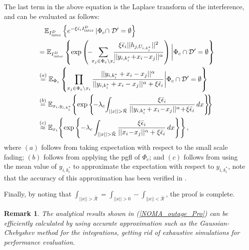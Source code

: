 \documentclass[10pt, doublecolumn]{IEEEtran}
\newtheorem{Remark}{Remark}
\begin{document}
\begin{IEEEproof}
The last term in the above equation is the Laplace transform of the interference, and can be evaluated as follows:
\begin{align}
&\quad{\mathbb{E}}_{I_{\text{inter}}^D } \left\{e^{-\xi\bar{\epsilon}_i  I_{\text{inter}}^D}\left| \Phi_c\cap\right.\mathcal{D}'=\emptyset\right\}\\\notag
&=\mathbb{E}_{I_{\text{inter}}^D}\left\{\exp\left(\!-\!\!\sum_{x_j\in \Phi_c\backslash x_i}\!\!\!\frac{\xi\bar{\epsilon}_i||h_{j,U_{i,k_i^*}}||^2}{||y_{i,k_i^*}\!+\!x_i\!-\!x_j||^{\alpha}}\right)\bigg|\Phi_c\cap\mathcal{D}'=\emptyset\right\}\\\notag
&\overset{(a)}{=}\mathbb{E}_{\Phi_c}\left\{
\prod_{x_j\in \Phi_c\backslash x_i}\frac{||y_{i,k_i^*}+x_i-x_j||^{\alpha}}{||y_{i,k_i^*}+x_i-x_j||^{\alpha}+\xi\bar{\epsilon}_i}
\bigg|\Phi_c\cap\mathcal{D}'=\emptyset\right\}\\\notag
&\overset{(b)}{=}\mathbb{E}_{x_i,y_{i,k_i^*}}\!\left\{\exp\left\{\!-\lambda_c\!\int_{||x||>\bar{\mathcal{R}}}
\frac{\xi\bar{\epsilon}_i}{||y_{i,k_i^*}\!+x_i\!-\!x_j||^{\alpha}\!+\!\xi\bar{\epsilon}_i}\,dx
\right\}\!\!\right\}\\\notag
&\overset{(c)}{\approx}\mathbb{E}_{x_i}\!\left\{\exp\left\{-\lambda_c\int_{||x||>\bar{\mathcal{R}}}
\frac{\xi\bar{\epsilon}_i}{||x_i\!-\!x_j||^{\alpha}+\xi\bar{\epsilon}_i}\,dx
\right\}\right\},
\end{align}
where $(a)$ follows from taking expectation with respect to the small scale fading; $(b)$ follows from applying the pgfl of $\Phi_c$; and $(c)$ follows from using the mean value of $y_{i,k_i^*}$ to approximate the expectation with respect to $y_{i,k_i^*}$, note that the accuracy of this approximation has been verified in \cite{sys2019PCP}.

Finally, by noting that $\int_{||x||>\bar{\mathcal{R}}}=\int_{||x||>0}-\int_{||x||<\bar{\mathcal{R}}}$, the proof is complete.
\end{IEEEproof}

\begin{Remark}
{\color{black}The analytical results shown in (\ref{NOMA_outage_Pro}) can be efficiently calculated by using accurate
approximation such as the Gaussian-Chebyshev method \cite{hildebrand1987introduction} for the integrations, getting rid of exhaustive simulations for performance evaluation.}
\end{Remark}
\end{document}
